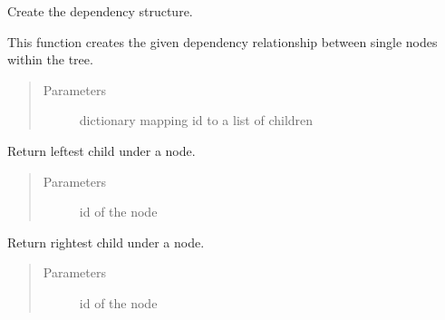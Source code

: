 \documentclass[letterpaper,10pt,english]{sphinxmanual}
\begin{document}
\begin{fulllineitems}
\begin{fulllineitems}
\begin{quote}
\begin{description}
\end{description}\end{quote}

\end{fulllineitems}


\begin{fulllineitems}
\label{\detokenize{api:conll_parser.Tree.create_tree_structure}}
Create the dependency structure.

This function creates the given dependency relationship
between single nodes within the tree.
\begin{quote}\begin{description}
\item[{Parameters}] \leavevmode
{} \textendash{} dictionary mapping id to a list of children

\end{description}\end{quote}

\end{fulllineitems}


\begin{fulllineitems}
\label{\detokenize{api:conll_parser.Tree.get_leftest_child}}
Return leftest child under a node.
\begin{quote}\begin{description}
\item[{Parameters}] \leavevmode
{} \textendash{} id of the node

\end{description}\end{quote}

\end{fulllineitems}


\begin{fulllineitems}
\label{\detokenize{api:conll_parser.Tree.get_rightest_child}}
Return rightest child under a node.
\begin{quote}\begin{description}
\item[{Parameters}] \leavevmode
{} \textendash{} id of the node


\end{description}
\end{quote}
\end{fulllineitems}
\end{fulllineitems}
\end{document}

